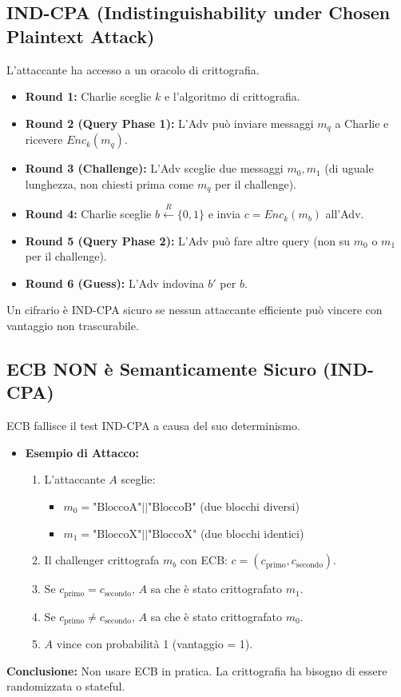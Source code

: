 \documentclass{article}
\begin{document}
\subsection{IND-CPA (Indistinguishability under Chosen Plaintext Attack)}
L'attaccante ha accesso a un oracolo di crittografia.
\begin{itemize}
    \item \textbf{Round 1:} Charlie sceglie $k$ e l'algoritmo di crittografia.
    \item \textbf{Round 2 (Query Phase 1):} L'Adv può inviare messaggi $m_q$ a Charlie e ricevere $Enc_k(m_q)$.
    \item \textbf{Round 3 (Challenge):} L'Adv sceglie due messaggi $m_0, m_1$ (di uguale lunghezza, non chiesti prima come $m_q$ per il challenge).
    \item \textbf{Round 4:} Charlie sceglie $b \xleftarrow{R} \{0,1\}$ e invia $c = Enc_k(m_b)$ all'Adv.
    \item \textbf{Round 5 (Query Phase 2):} L'Adv può fare altre query (non su $m_0$ o $m_1$ per il challenge).
    \item \textbf{Round 6 (Guess):} L'Adv indovina $b'$ per $b$.
\end{itemize}
Un cifrario è IND-CPA sicuro se nessun attaccante efficiente può vincere con vantaggio non trascurabile.

\subsection{ECB NON è Semanticamente Sicuro (IND-CPA)}
ECB fallisce il test IND-CPA a causa del suo determinismo.
\begin{itemize}
    \item \textbf{Esempio di Attacco:}
    \begin{enumerate}
        \item L'attaccante $A$ sceglie:
        \begin{itemize}
            \item $m_0 = \text{"BloccoA"} || \text{"BloccoB"}$ (due blocchi diversi)
            \item $m_1 = \text{"BloccoX"} || \text{"BloccoX"}$ (due blocchi identici)
        \end{itemize}
        \item Il challenger crittografa $m_b$ con ECB: $c = (c_{\text{primo}}, c_{\text{secondo}})$.
        \item Se $c_{\text{primo}} = c_{\text{secondo}}$, $A$ sa che è stato crittografato $m_1$.
        \item Se $c_{\text{primo}} \neq c_{\text{secondo}}$, $A$ sa che è stato crittografato $m_0$.
        \item $A$ vince con probabilità 1 (vantaggio = 1).
    \end{enumerate}
\end{itemize}
\textbf{Conclusione:} Non usare ECB in pratica. La crittografia ha bisogno di essere randomizzata o stateful.
\end{document}
